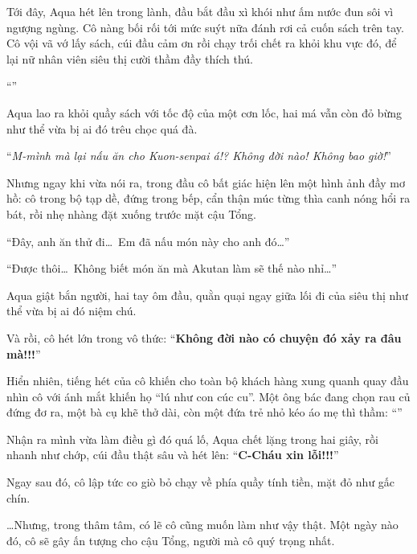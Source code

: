 \documentclass[../main.tex]{subfiles}
\begin{document}
Tới đây, Aqua hét lên trong lành, đầu bắt đầu xì khói như ấm nước đun sôi vì ngượng ngùng. Cô nàng bối rối tới mức suýt nữa đánh rơi cả cuốn sách trên tay. Cô vội vã vớ lấy sách, cúi đầu cảm ơn rồi chạy trối chết ra khỏi khu vực đó, để lại nữ nhân viên siêu thị cười thầm đầy thích thú.

``''

Aqua lao ra khỏi quầy sách với tốc độ của một cơn lốc, hai má vẫn còn đỏ bừng như thể vừa bị ai đó trêu chọc quá đà.

``\textit{M-mình mà lại nấu ăn cho Kuon-senpai á!? Không đời nào! Không bao giờ!}''

Nhưng ngay khi vừa nói ra, trong đầu cô bất giác hiện lên một hình ảnh đầy mơ hồ: cô trong bộ tạp dề, đứng trong bếp, cẩn thận múc từng thìa canh nóng hổi ra bát, rồi nhẹ nhàng đặt xuống trước mặt cậu Tổng.

``Đây, anh ăn thử đi\dots\ Em đã nấu món này cho anh đó\dots''

``Được thôi\dots\ Không biết món ăn mà Akutan làm sẽ thế nào nhỉ\dots''

Aqua giật bắn người, hai tay ôm đầu, quằn quại ngay giữa lối đi của siêu thị như thể vừa bị ai đó niệm chú.

Và rồi, cô hét lớn trong vô thức: ``\textbf{Không đời nào có chuyện đó xảy ra đâu mà!!!}''

Hiển nhiên, tiếng hét của cô khiến cho toàn bộ khách hàng xung quanh quay đầu nhìn cô với ánh mắt khiến họ ``lú như con cúc cu''. Một ông bác đang chọn rau củ đứng đơ ra, một bà cụ khẽ thở dài, còn một đứa trẻ nhỏ kéo áo mẹ thì thầm: ``''

Nhận ra mình vừa làm điều gì đó quá lố, Aqua chết lặng trong hai giây, rồi nhanh như chớp, cúi đầu thật sâu và hét lên: ``\textbf{C-Cháu xin lỗi!!!}''

Ngay sau đó, cô lập tức co giò bỏ chạy về phía quầy tính tiền, mặt đỏ như gấc chín.

\dots Nhưng, trong thâm tâm, có lẽ cô cũng muốn làm như vậy thật. Một ngày nào đó, cô sẽ gây ấn tượng cho cậu Tổng, người mà cô quý trọng nhất.

\vspace{-40pt}
\subsubsection*{\label{P1.1b}}
\end{document}
